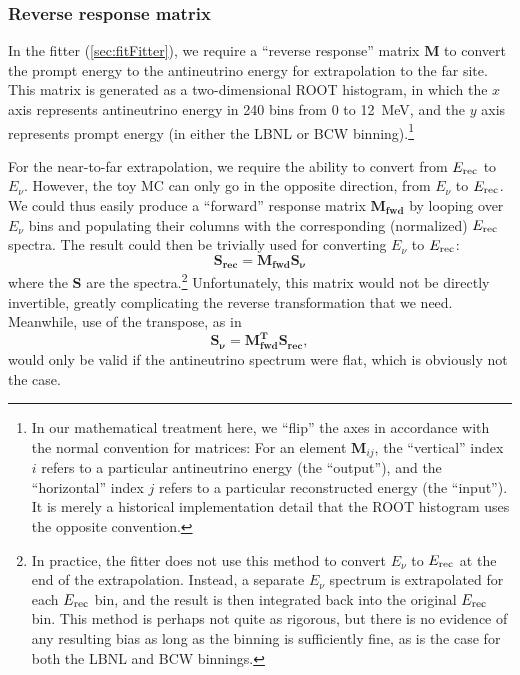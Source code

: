 \documentclass[../thesis.tex]{subfiles}
\begin{document}
\subsubsection{Reverse response matrix}

In the fitter (\autoref{sec:fitFitter}), we require a ``reverse response'' matrix $\mathbf{M}$ to convert the prompt energy to the antineutrino energy for extrapolation to the far site. This matrix is generated as a two-dimensional ROOT histogram, in which the $x$ axis represents antineutrino energy in 240 bins from 0 to 12~MeV, and the $y$ axis represents prompt energy (in either the LBNL or BCW binning).\footnote{In our mathematical treatment here, we ``flip'' the axes in accordance with the normal convention for matrices: For an element $\mathbf{M}_{ij}$, the ``vertical'' index $i$ refers to a particular antineutrino energy (the ``output''), and the ``horizontal'' index $j$ refers to a particular reconstructed energy (the ``input''). It is merely a historical implementation detail that the ROOT histogram uses the opposite convention.}

\begin{comment}
  I don't see any reason to mention the fact that a finer binning (2880 instead of 240) is used internally by the toy MC when generating this matrix. With the standard 240 bins, the edges line up with both the LBNL and BCW edges, so there shouldn't be any benefit from using a finer binning.

  deleted: Internally, the toy MC normally represents both neutrino and prompt energy using 240 bins (of 50~keV) from 0 to 12~MeV.
\end{comment}

For the near-to-far extrapolation, we require the ability to convert from $E_\mathrm{rec}$ to $E_\nu$. However, the toy MC can only go in the opposite direction, from $E_\nu$ to $E_\mathrm{rec}$. We could thus easily produce a ``forward'' response matrix $\mathbf{M_{fwd}}$ by looping over $E_\nu$ bins and populating their columns with the corresponding (normalized) $E_\mathrm{rec}$ spectra. The result could then be trivially used for converting $E_\nu$ to $E_\mathrm{rec}$:
\begin{equation}
  \mathbf{S_{rec}} = \mathbf{M_{fwd}} \mathbf{S_\nu} 
\end{equation}
where the $\mathbf{S}$ are the spectra.\footnote{\label{foot:fitEnuToErec}In practice, the fitter does not use this method to convert $E_\nu$ to $E_\mathrm{rec}$ at the end of the extrapolation. Instead, a separate $E_\nu$ spectrum is extrapolated for each $E_\mathrm{rec}$ bin, and the result is then integrated back into the original $E_\mathrm{rec}$ bin. This method is perhaps not quite as rigorous, but there is no evidence of any resulting bias as long as the binning is sufficiently fine, as is the case for both the LBNL and BCW binnings.} Unfortunately, this matrix would not be directly invertible, greatly complicating the reverse transformation that we need. Meanwhile, use of the transpose, as in
\begin{equation}
  \mathbf{S_\nu} = \mathbf{M_{fwd}^{T}} \mathbf{S_{rec}},
\end{equation}
would only be valid if the antineutrino spectrum were flat, which is obviously not the case.
\end{document}
